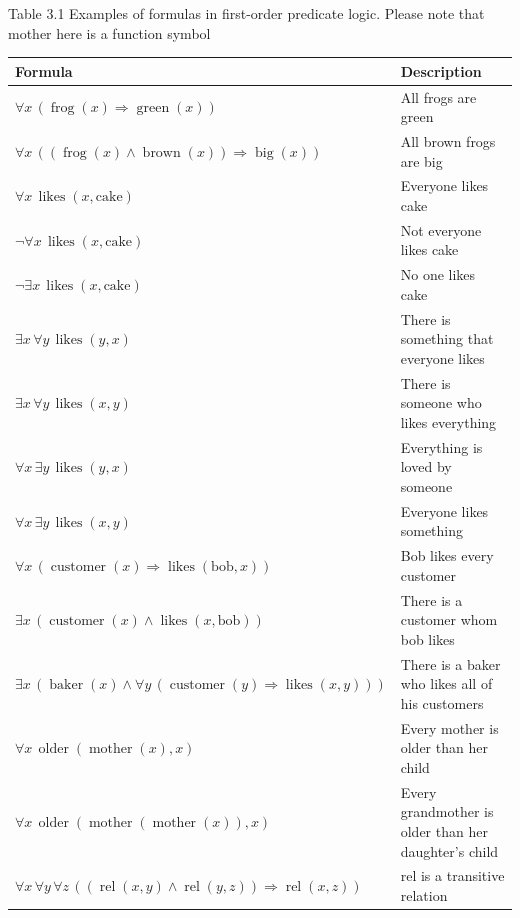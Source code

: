 \documentclass[10pt]{book}
\begin{document}
Table 3.1 Examples of formulas in first-order predicate logic. Please note that mother here is a function symbol
\begin{center}
\begin{tabular}{|l|l|}
\hline
Formula & Description \\
\hline
$\forall x\, (\operatorname{frog}(x) \Rightarrow \operatorname{green}(x))$ & All frogs are green \\
\hline
$\forall x\, ((\operatorname{frog}(x) \wedge \operatorname{brown}(x)) \Rightarrow \operatorname{big}(x))$ & All brown frogs are big \\
\hline
$\forall x\, \operatorname{likes}(x,\mathrm{cake})$ & Everyone likes cake \\
\hline
$\neg \forall x\, \operatorname{likes}(x,\mathrm{cake})$ & Not everyone likes cake \\
\hline
$\neg \exists x\, \operatorname{likes}(x,\mathrm{cake})$ & No one likes cake \\
\hline
$\exists x\, \forall y\, \operatorname{likes}(y,x)$ & There is something that everyone likes \\
\hline
$\exists x\, \forall y\, \operatorname{likes}(x,y)$ & There is someone who likes everything \\
\hline
$\forall x\, \exists y\, \operatorname{likes}(y,x)$ & Everything is loved by someone \\
\hline
$\forall x\, \exists y\, \operatorname{likes}(x,y)$ & Everyone likes something \\
\hline
$\forall x\, (\operatorname{customer}(x) \Rightarrow \operatorname{likes}(\mathrm{bob},x))$ & Bob likes every customer \\
\hline
$\exists x\, (\operatorname{customer}(x) \wedge \operatorname{likes}(x,\mathrm{bob}))$ & There is a customer whom bob likes \\
\hline
$\exists x\, (\operatorname{baker}(x) \wedge \forall y\, (\operatorname{customer}(y) \Rightarrow \operatorname{likes}(x,y)))$ & There is a baker who likes all of his customers \\
\hline
$\forall x\, \operatorname{older}(\operatorname{mother}(x),x)$ & Every mother is older than her child \\
\hline
$\forall x\, \operatorname{older}(\operatorname{mother}(\operatorname{mother}(x)),x)$ & Every grandmother is older than her daughter's child \\
\hline
$\forall x\, \forall y\, \forall z\, ((\operatorname{rel}(x,y) \wedge \operatorname{rel}(y,z)) \Rightarrow \operatorname{rel}(x,z))$ & rel is a transitive relation \\
\hline
\end{tabular}
\end{center}
\end{document}
